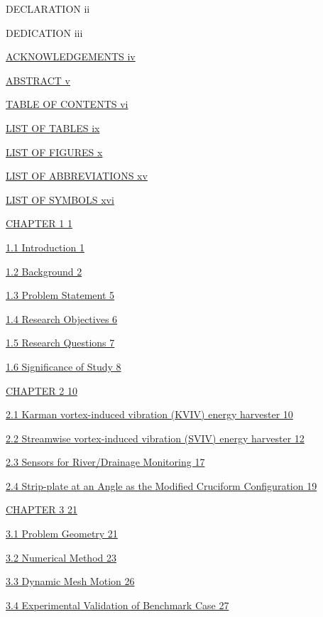 \documentclass[]{article}
\begin{document}
DECLARATION ii

DEDICATION iii

\protect\hyperlink{_Toc41048784}{ACKNOWLEDGEMENTS iv}

\protect\hyperlink{_Toc41048785}{ABSTRACT v}

\protect\hyperlink{_Toc41048786}{TABLE OF CONTENTS vi}

\protect\hyperlink{_Toc41048787}{LIST OF TABLES ix}

\protect\hyperlink{_Toc41048788}{LIST OF FIGURES x}

\protect\hyperlink{_Toc41048789}{LIST OF ABBREVIATIONS xv}

\protect\hyperlink{_Toc41048790}{LIST OF SYMBOLS xvi}

\protect\hyperlink{_Toc41048791}{CHAPTER 1 1}

\protect\hyperlink{introduction}{1.1 Introduction 1}

\protect\hyperlink{background}{1.2 Background 2}

\protect\hyperlink{problem-statement}{1.3 Problem Statement 5}

\protect\hyperlink{research-objectives}{1.4 Research Objectives 6}

\protect\hyperlink{research-questions}{1.5 Research Questions 7}

\protect\hyperlink{significance-of-study}{1.6 Significance of Study 8}

\protect\hyperlink{_Toc41048798}{CHAPTER 2 10}

\protect\hyperlink{_Toc41048799}{2.1 Karman vortex-induced vibration
(KVIV) energy harvester 10}

\protect\hyperlink{_Toc41048800}{2.2 Streamwise vortex-induced vibration
(SVIV) energy harvester 12}

\protect\hyperlink{_Toc41048801}{2.3 Sensors for River/Drainage
Monitoring 17}

\protect\hyperlink{strip-plate-at-an-angle-as-the-modified-cruciform-configuration}{2.4
Strip-plate at an Angle as the Modified Cruciform Configuration 19}

\protect\hyperlink{_Toc41048803}{CHAPTER 3 21}

\protect\hyperlink{problem-geometry}{3.1 Problem Geometry 21}

\protect\hyperlink{numerical-method}{3.2 Numerical Method 23}

\protect\hyperlink{dynamic-mesh-motion}{3.3 Dynamic Mesh Motion 26}

\protect\hyperlink{_Toc41048807}{3.4 Experimental Validation of
Benchmark Case 27}
\end{document}
